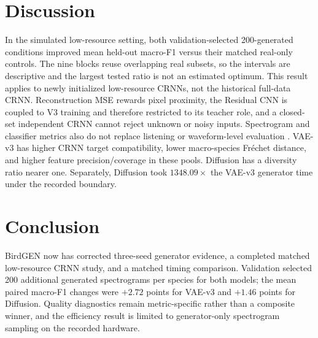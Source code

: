 \documentclass{article}
\begin{document}
\section{Discussion}

In the simulated low-resource setting, both validation-selected 200-generated
conditions improved mean held-out macro-F1 versus their matched real-only
controls. The
nine blocks reuse overlapping real subsets, so the intervals are descriptive
and the largest tested ratio is not an estimated optimum. This result applies
to newly initialized low-resource CRNNs, not the historical full-data CRNN.
Reconstruction MSE rewards pixel proximity, the Residual CNN is coupled to
V3 training and therefore restricted to its teacher role, and a closed-set
independent CRNN cannot reject unknown or noisy inputs. Spectrogram and
classifier metrics also do not replace listening or waveform-level evaluation
\cite{bhatia2022birdsong}. VAE-v3 has higher CRNN target
compatibility, lower macro-species Fr\'echet distance, and higher feature
precision/coverage in these pools. Diffusion has a diversity ratio nearer one.
Separately,
Diffusion took $1348.09\times$ the VAE-v3
generator time under the recorded boundary.

\section{Conclusion}

BirdGEN now has corrected three-seed generator evidence, a completed matched
low-resource CRNN study, and a matched timing comparison. Validation selected
200 additional generated spectrograms per species for both models; the mean paired macro-F1 changes were $+2.72$
points for VAE-v3 and $+1.46$ points for Diffusion. Quality diagnostics remain
metric-specific rather than a composite winner, and the efficiency result is
limited to generator-only spectrogram sampling on the recorded hardware.
\end{document}
